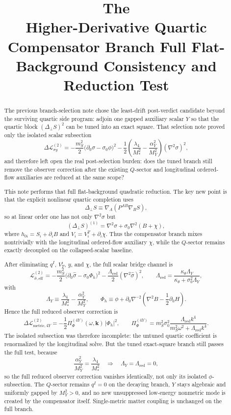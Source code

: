\documentclass[11pt]{article}
\title{\textbf{The \TheoryName{}}\\[0.4em]
\large Higher-Derivative Quartic Compensator Branch Full Flat-Background Consistency and Reduction Test}
\author{}
\date{}
\begin{document}
\maketitle

\begin{abstract}
The previous branch-selection note chose the least-drift post-verdict candidate beyond the surviving quartic side program: adjoin one gapped auxiliary scalar \(Y\) so that the quartic block \((\Delta_\perp S)^2\) can be tuned into an exact square. That selection note proved only the isolated scalar subsection
\[
\Delta\mathcal L_{\sigma y}^{(2)}
=
-\frac{m_S^2}{2}\bigl(\partial_0\sigma-\sigma_0\phi\bigr)^2
-\frac{1}{2}
\left(
\frac{\lambda_4}{M_*^2}
-\frac{\alpha_Y^2}{M_Y^2}
\right)
(\nabla^2\sigma)^2,
\]
and therefore left open the real post-selection burden: does the tuned branch still remove the observer correction after the existing \(Q\)-sector and longitudinal ordered-flow auxiliaries are reduced at the same scope?

This note performs that full flat-background quadratic reduction. The key new point is that the explicit nonlinear quartic completion uses
\[
\Delta_\perp S
\equiv
\nabla_A\!\left(P^{AB}\nabla_B S\right),
\]
so at linear order one has not only \(\nabla^2\sigma\) but
\[
(\Delta_\perp S)^{(1)}
=
\nabla^2\sigma+\sigma_0\nabla^2(B+\chi),
\]
where \(h_{0i}=S_i+\partial_iB\) and \(V_i=V_i^T+\partial_i\chi\). Thus the compensator branch mixes nontrivially with the longitudinal ordered-flow auxiliary \(\chi\), while the \(Q\)-sector remains exactly decoupled on the collapsed-scalar baseline.

After eliminating \(q^I\), \(V_T^i\), \(y\), and \(\chi\), the full scalar bridge channel is
\[
\mathcal L_{\hat\sigma,\mathrm{eff}}^{(2)}
=
-\frac{m_S^2}{2}\bigl(\partial_0\hat\sigma-\sigma_0\Phi_h\bigr)^2
-\frac{\Lambda_{\mathrm{red}}}{2}(\nabla^2\hat\sigma)^2,
\qquad
\Lambda_{\mathrm{red}}
=
\frac{\kappa_\theta\Lambda_Y}{\kappa_\theta+\sigma_0^2\Lambda_Y},
\]
with
\[
\Lambda_Y
\equiv
\frac{\lambda_4}{M_*^2}-\frac{\alpha_Y^2}{M_Y^2},
\qquad
\Phi_h
\equiv
\phi+\partial_0\nabla^{-2}\!\left(\nabla^2B-\frac{1}{2}\partial_0H\right).
\]
Hence the full reduced observer correction is
\[
\Delta\mathcal L_{\mathrm{metric},4Y}^{(2)}
=
-\frac{1}{2}\Pi_{\Phi}^{(4Y)}(\omega,\mathbf{k})\,|\Phi_h|^2,
\qquad
\Pi_{\Phi}^{(4Y)}
=
m_S^2\sigma_0^2
\frac{\Lambda_{\mathrm{red}}k^4}
{m_S^2\omega^2+\Lambda_{\mathrm{red}}k^4}.
\]
The isolated subsection was therefore incomplete: the untuned quartic coefficient is renormalized by the longitudinal solve. But the tuned exact-square branch still passes the full test, because
\[
\frac{\alpha_Y^2}{M_Y^2}=\frac{\lambda_4}{M_*^2}
\quad\Longrightarrow\quad
\Lambda_Y=\Lambda_{\mathrm{red}}=0,
\]
so the full reduced observer correction vanishes identically, not only its isolated \(\phi\)-subsection. The \(Q\)-sector remains \(q^I=0\) on the decaying branch, \(Y\) stays algebraic and uniformly gapped by \(M_Y^2>0\), and no new unsuppressed low-energy nonmetric mode is created by the compensator itself. Single-metric matter coupling is unchanged on the full branch.


\end{abstract}
\end{document}
